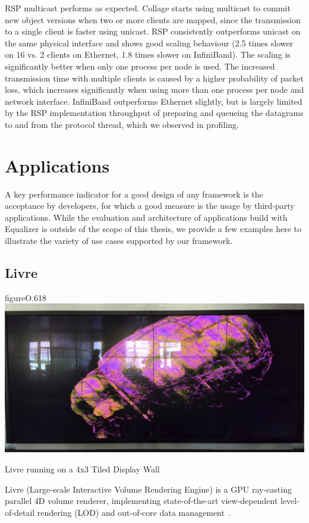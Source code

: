 RSP multicast performs as expected. Collage starts using multicast to commit
new object versions when two or more clients are mapped, since the transmission
to a single client is faster using unicast. RSP consistently outperforms
unicast on the same physical interface and shows good scaling behaviour (2.5
times slower on 16 vs. 2 clients on Ethernet, 1.8 times slower on InfiniBand).
The scaling is significantly better when only one process per node is used. The
increased transmission time with multiple clients is caused by a higher
probability of packet loss, which increases significantly when using more than
one process per node and network interface. InfiniBand outperforms Ethernet
slightly, but is largely limited by the RSP implementation throughput of
preparing and queueing the datagrams to and from the protocol thread, which we
observed in profiling.


\chapter{Applications}\label{sApplications}

A key performance indicator for a good design of any framework is the
acceptance by developers, for which a good measure is the usage by third-party
applications. While the evaluation and architecture of applications build with
Equalizer is outside of the scope of this thesis, we provide a few examples
here to illustrate the variety of use cases supported by our framework.

\section{Livre}

\begin{wrapfloat}{figure}{O}{.618\textwidth}
  \includegraphics[width=.618\textwidth]{images/livre}
  {\caption{\label{fLivre}Livre running on a 4x3 Tiled Display Wall}}
\end{wrapfloat}

Livre (Large-scale Interactive Volume Rendering Engine) is a GPU ray-casting
parallel 4D volume renderer, implementing state-of-the-art view-dependent
level-of-detail rendering (LOD) and out-of-core data
management~\cite{EHKRW:06}.

